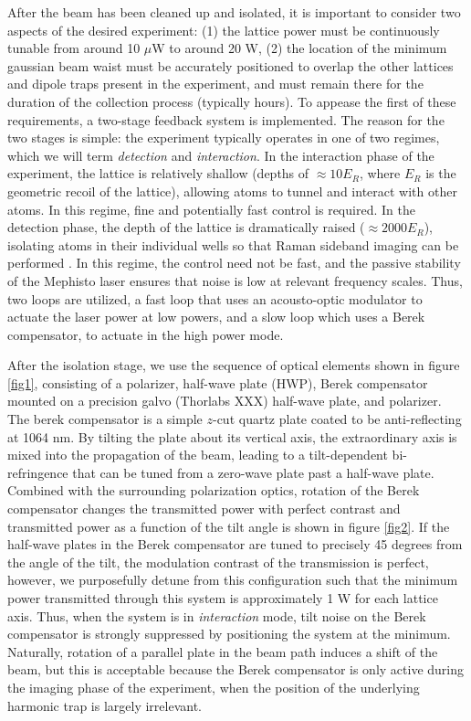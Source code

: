 \documentclass[twocolumn,aps,pra,showpacs,preprintnumbers,bibnotes]{revtex4-1}
\begin{document}
After the beam has been cleaned up and isolated, it is important to consider two aspects of the desired experiment: (1) the lattice power must be continuously tunable from around 10 $\mu$W to around 20 W, (2) the location of the minimum gaussian beam waist must be accurately positioned to overlap the other lattices and dipole traps present in the experiment, and must remain there for the duration of the collection process (typically hours).
To appease the first of these requirements, a two-stage feedback system is implemented. The reason for the two stages is simple: the experiment typically operates in one of two regimes, which we will term \textit{detection} and \textit{interaction}. 
In the interaction phase of the experiment, the lattice is relatively shallow (depths of $\approx 10 E_R$, where $E_R$ is the geometric recoil of the lattice), allowing atoms to tunnel and interact with other atoms. 
In this regime, fine and potentially fast control is required.
In the detection phase, the depth of the lattice is dramatically raised ($\approx 2000 E_R$), isolating atoms in their individual wells so that Raman sideband imaging can be performed \cite{parsons2015}.
In this regime, the control need not be fast, and the passive stability of the Mephisto laser ensures that noise is low at relevant frequency scales.
Thus, two loops are utilized, a fast loop that uses an acousto-optic modulator to actuate the laser power at low powers, and a slow loop which uses a Berek compensator, to actuate in the high power mode.

After the isolation stage, we use the sequence of optical elements shown in figure \ref{fig1}, consisting of a polarizer, half-wave plate (HWP), Berek compensator mounted on a precision galvo (Thorlabs XXX) half-wave plate, and polarizer. The berek compensator is a simple $z$-cut quartz plate coated to be anti-reflecting at 1064 nm. 
By tilting the plate about its vertical axis, the extraordinary axis is mixed into the propagation of the beam, leading to a tilt-dependent bi-refringence that can be tuned from a zero-wave plate past a half-wave plate.
Combined with the surrounding polarization optics, rotation of the Berek compensator changes the transmitted power with perfect contrast and transmitted power as a function of the tilt angle is shown in figure \ref{fig2}.
If the half-wave plates in the Berek compensator are tuned to precisely 45 degrees from the angle of the tilt, the modulation contrast of the transmission is perfect, however, we purposefully detune from this configuration such that the minimum power transmitted through this system is approximately 1 W for each lattice axis. 
Thus, when the system is in \textit{interaction} mode, tilt noise on the Berek compensator is strongly suppressed by positioning the system at the minimum.
Naturally, rotation of a parallel plate in the beam path induces a shift of the beam, but this is acceptable because the Berek compensator is only active during the imaging phase of the experiment, when the position of the underlying harmonic trap is largely irrelevant.
\end{document}
